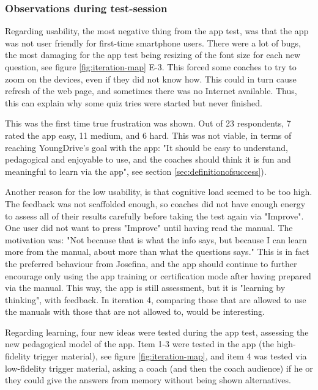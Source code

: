   \subsubsection{Observations during test-session}

  Regarding usability, the most negative thing from the app test, was that the app was not user friendly for first-time smartphone users. There were a lot of bugs, the most damaging for the app test being resizing of the font size for each new question, see figure \ref{fig:iteration-map} E-3. This forced some coaches to try to zoom on the devices, even if they did not know how. This could in turn cause refresh of the web page, and sometimes there was no Internet available. Thus, this can explain why some quiz tries were started but never finished.

  This was the first time true frustration was shown. Out of 23 respondents, 7 rated the app easy, 11 medium, and 6 hard. This was not viable, in terms of reaching YoungDrive's goal with the app: "It should be easy to understand, pedagogical and enjoyable to use, and the coaches should think it is fun and meaningful to learn via the app", see section \ref{sec:definitionofsuccess}).

  Another reason for the low usability, is that cognitive load seemed to be too high. The feedback was not scaffolded enough, so coaches did not have enough energy to assess all of their results carefully before taking the test again via "Improve". One user did not want to press "Improve" until having read the manual. The motivation was: "Not because that is what the info says, but because I can learn more from the manual, about more than what the questions says." This is in fact the preferred behaviour from Josefina, and the app should continue to further encourage only using the app training or certification mode after having prepared via the manual. This way, the app is still assessment, but it is "learning by thinking", with feedback. In iteration 4, comparing those that are allowed to use the manuals with those that are not allowed to, would be interesting.

  Regarding learning, four new ideas were tested during the app test, assessing the new pedagogical model of the app. Item 1-3 were tested in the app (the high-fidelity trigger material), see figure \ref{fig:iteration-map}, and item 4 was tested via low-fidelity trigger material, asking a coach (and then the coach audience) if he or they could give the answers from memory without being shown alternatives.


